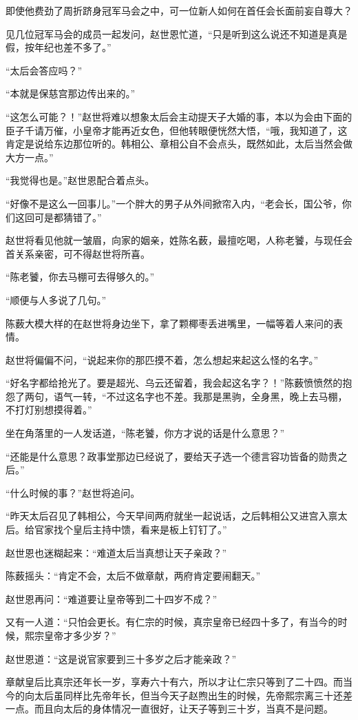 即使他费劲了周折跻身冠军马会之中，可一位新人如何在首任会长面前妄自尊大？

见几位冠军马会的成员一起发问，赵世恩忙道，“只是听到这么说还不知道是真是假，按年纪也差不多了。”

“太后会答应吗？”

“本就是保慈宫那边传出来的。”

“这怎么可能？！”赵世将难以想象太后会主动提天子大婚的事，本以为会由下面的臣子千请万催，小皇帝才能再近女色，但他转眼便恍然大悟，“哦，我知道了，这肯定是说给东边那位听的。韩相公、章相公自不会点头，既然如此，太后当然会做大方一点。”

“我觉得也是。”赵世恩配合着点头。

“好像不是这么一回事儿。”一个胖大的男子从外间掀帘入内，“老会长，国公爷，你们这回可是都猜错了。”

赵世将看见他就一皱眉，向家的姻亲，姓陈名薮，最擅吃喝，人称老饕，与现任会首关系亲密，可不得赵世将所喜。

“陈老饕，你去马棚可去得够久的。”

“顺便与人多说了几句。”

陈薮大模大样的在赵世将身边坐下，拿了颗椰枣丢进嘴里，一幅等着人来问的表情。

赵世将偏偏不问，“说起来你的那匹摸不着，怎么想起来起这么怪的名字。”

“好名字都给抢光了。要是超光、乌云还留着，我会起这名字？！”陈薮愤愤然的抱怨了两句，语气一转，“不过这名字也不差。我那是黑驹，全身黑，晚上去马棚，不打灯别想摸得着。”

坐在角落里的一人发话道，“陈老饕，你方才说的话是什么意思？”

“还能是什么意思？政事堂那边已经说了，要给天子选一个德言容功皆备的勋贵之后。”

“什么时候的事？”赵世将追问。

“昨天太后召见了韩相公，今天早间两府就坐一起说话，之后韩相公又进宫入禀太后。给官家找个皇后主持中馈，看来是板上钉钉了。”

赵世恩也迷糊起来：“难道太后当真想让天子亲政？”

陈薮摇头：“肯定不会，太后不做章献，两府肯定要闹翻天。”

赵世恩再问：“难道要让皇帝等到二十四岁不成？”

又有一人道：“只怕会更长。有仁宗的时候，真宗皇帝已经四十多了，有当今的时候，熙宗皇帝才多少岁？”

赵世恩道：“这是说官家要到三十多岁之后才能亲政？”

章献皇后比真宗还年长一岁，享寿六十有六，所以才让仁宗只等到了二十四。而当今的向太后虽同样比先帝年长，但当今天子赵煦出生的时候，先帝熙宗离三十还差一点。而且向太后的身体情况一直很好，让天子等到三十岁，当真不是问题。

